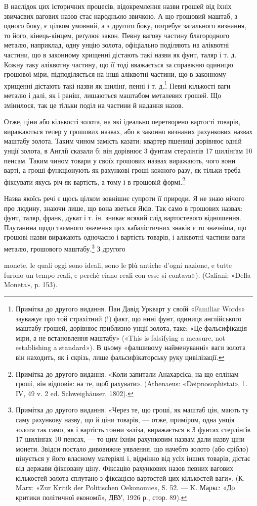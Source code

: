 В наслідок цих історичних процесів, відокремлення назви
грошей від їхніх звичаєвих вагових назов стає народньою звичкою.
А що грошовий маштаб, з одного боку, є цілком умовний,
а з другого боку, потребує загального визнання, то його, кінець-кінцем,
реґулює закон. Певну вагову частину благородного
металю, наприклад, одну унцію золота, офіціально поділяють
на аліквотні частини, що в законному хрищенні дістають
такі назви як фунт, таляр і т. д. Кожну таку аліквотну частину,
що її тоді вважається за справжню одиницю грошової міри, підподіляється
на інші аліквотні частини, що в законному хрищенні
дістають такі назви як шилінґ, пенні і т. д.\footnote{
Примітка до другого видання. Пан Давід Уркварт у своїй «Familiar
Words» зауважує про той страхітний (!) факт, що нині фунт, одиниця
англійського маштабу грошей, дорівнює приблизно  унції золота, таке:
«Це фальсифікація міри, а не встановлення маштабу» («This is falsifying
a measure, not establishing a standard»). В цьому «фалшивому
найменуванні» ваги золота він находить, як і скрізь, лише фальсифікаторську
руку цивілізації.
} Певні кількості ваги
металю і далі, як і раніш, лишаються маштабом металевих грошей.
Що змінилося, так це тільки поділ на частини й надання назов.

Отже, ціни або кількості золота, на які ідеально перетворено
вартості товарів, виражаються тепер у грошових назвах, або в
законно визнаних рахункових назвах маштабу золота. Таким
чином замість казати: квартер пшениці дорівнює одній унції
золота, в Англії сказали б: він дорівнює 3 фунтам стерлінґів
17 шилінґам 10 пенсам. Таким чином товари у своїх грошових
назвах виражають, чого вони варті, а гроші функціонують як
рахункові гроші кожного разу, як тільки треба фіксувати якусь
річ як вартість, а тому і в грошовій формі.\footnote{
Примітка до другого видання. «Коли запитали Анахарсіса, на що
еллінам гроші, він відповів: на те, щоб рахувати». (Athenaeus: «Deipnosophistai»,
1. IV, 49 v. 2 ed. Schweighäuser, 1802).
}

Назва якоїсь речі є щось цілком зовнішнє супроти її природи.
Я не знаю нічого про людину, знаючи лише, що вона зветься
Яків. Так само в грошових назвах: фунт, таляр, франк, дукат
і т. ін. зникає всякий слід вартостевого відношення. Плутанина
щодо таємного значення цих кабалістичних знаків є то значніша,
що грошові назви виражають одночасно і вартість товарів,
і аліквотні частини ваги металю, грошового маштабу.\footnote{
Примітка до другого видання. «Через те, що гроші, як маштаб цін,
мають ту саму рахункову назву, що й ціни товарів, — отже, приміром,
одна унція золота так само, як і вартість тонни заліза, виражається в
З фунтах стерлінґів 17 шилінґах 10 пенсах, — то цим їхнім рахунковим
назвам дали назву ціни монети. Звідси постало дивовижне уявлення, що
начебто золото (або срібло) цінується у його власному матеріялі і, відмінно
від усіх інших товарів, дістає від держави фіксовану ціну. Фіксацію
рахункових назов певних вагових кількостей золота сплутано з
фіксацією вартостей цих кількостей ваги». (К. Marx: «Zur Kritik der
Politischen Oekonomie», S. 52. — K. Маркс: «До критики політичної
економії», ДВУ, 1926 р., стор. 89).
} З другого

monete, le quali oggi sono ideali, sono le ріù antiche d’ogni nazione, e tutte
furono un tempo reali, e perchè eiano reali con esse si contava»). (Galiani:
«Della Moneta», p. 153).